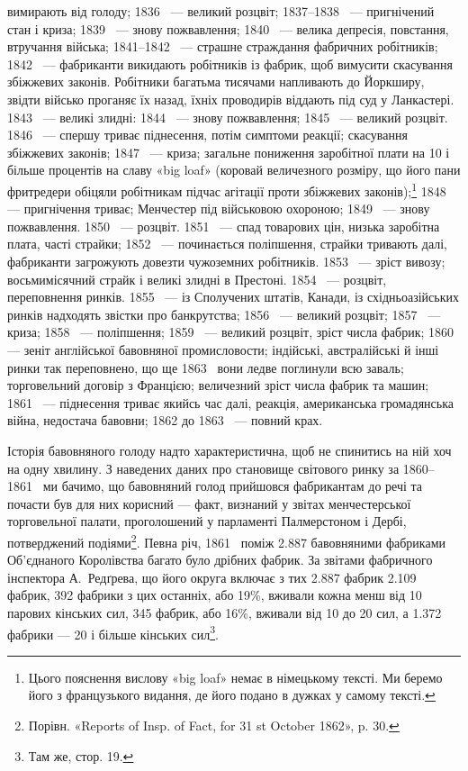 \parcont{}  %
вимирають від голоду; 1836~ — великий розцвіт; 1837--1838~ —
пригнічений стан і криза; 1839~ — знову пожвавлення; 1840~ —
велика депресія, повстання, втручання війська; 1841--1842~ —
страшне страждання фабричних робітників; 1842~ — фабриканти
викидають робітників із фабрик, щоб вимусити скасування збіжжевих
законів. Робітники багатьма тисячами напливають до
Йоркширу, звідти військо проганяє їх назад, їхніх проводирів
віддають під суд у Ланкастері. 1843~ — великі злидні: 1844~ —
знову пожвавлення; 1845~ — великий розцвіт. 1846~ — спершу
триває піднесення, потім симптоми реакції; скасування збіжжевих
законів; 1847~ — криза; загальне пониження заробітної плати
на 10 і більше процентів на славу «big loaf» (коровай величезного
розміру, що його пани фритредери обіцяли робітникам підчас
агітації проти збіжжевих законів);\footnote*{
Цього пояснення вислову «big loaf» немає в німецькому тексті.
Ми беремо його з французького видання, де його подано в дужках у самому
тексті. 
} 1848~ — пригнічення триває; Менчестер під військовою охороною; 1849~ —
знову пожвавлення. 1850~ — розцвіт. 1851~ — спад товарових цін, низька
заробітна плата, часті страйки; 1852~ — починається поліпшення,
страйки тривають далі, фабриканти загрожують довезти чужоземних
робітників. 1853~ — зріст вивозу; восьмимісячний страйк
і великі злидні в Престоні. 1854~ — розцвіт, переповнення ринків.
1855~ — із Сполучених штатів, Канади, із східньоазійських
ринків надходять звістки про банкрутства; 1856~ — великий
розцвіт; 1857~ — криза; 1858~ — поліпшення; 1859~ — великий
розцвіт, зріст числа фабрик; 1860~ — зеніт англійської
бавовняної промисловости; індійські, австралійські й інші ринки
так переповнено, що ще 1863~ вони ледве поглинули всю заваль;
торговельний договір з Францією; величезний зріст числа фабрик
та машин; 1861~ — піднесення триває якийсь час далі, реакція,
американська громадянська війна, недостача бавовни; 1862 до
1863~ — повний крах.

Історія бавовняного голоду надто характеристична, щоб не
спинитись на ній хоч на одну хвилину. З наведених даних про
становище світового ринку за 1860--1861~ ми бачимо, що
бавовняний голод прийшовся фабрикантам до речі та почасти був
для них корисний — факт, визнаний у звітах менчестерської
торговельної палати, проголошений у парламенті Палмерстоном
і Дербі, потверджений подіями\footnote{
Порівн. «Reports of Insp. of Fact, for 31 st October 1862», p. 30.
}. Певна річ, 1861~
поміж \num{2.887} бавовняними фабриками Об’єднаного Королівства
багато було дрібних фабрик. За звітами фабричного інспектора
А.~Редґрева, що його округа включає з тих \num{2.887} фабрик \num{2.109} фабрик,
392 фабрики з цих останніх, або 19\%, вживали кожна
менш від 10 парових кінських сил, 345 фабрик, або 16\%, вживали
від 10 до 20 сил, а \num{1.372} фабрики — 20 і більше кінських сил\footnote{
Там же, стор. 19.
}.
\parbreak{}  %
